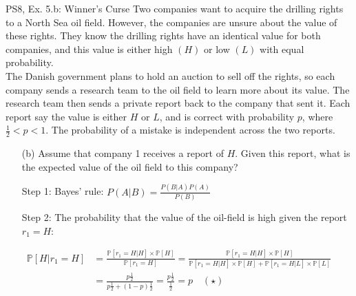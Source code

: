 \begin{frame}{PS8, Ex. 5.b: Winner's Curse}
      Two companies want to acquire the drilling rights to a North Sea oil field. However, the companies are unsure about the value of these rights. They know the drilling rights have an identical value for both companies, and this value is either high $(H)$ or low $(L)$ with equal probability.\\\smallskip
      The Danish government plans to hold an auction to sell off the rights, so each company sends a research team to the oil field to learn more about its value. The research team then sends a private report back to the company that sent it. Each report say the value is either $H$ or $L$, and is correct with probability $p$, where $\frac{1}{2} < p < 1$. The probability of a mistake is independent across the two reports.
      \begin{itemize}
        \item[(b)] Assume that company 1 receives a report of $H$. Given this report, what is the expected value of the oil field to this company?
        \item[Step 1:] Bayes' rule: $P(A|B)=\frac{P(B|A)P(A)}{P(B)}$
        \item[Step 2:] The probability that the value of the oil-field is high given the report $r_1=H$:
      \end{itemize}
      \vspace{-12pt}
      \begin{align*}
        \mathbb{P}[H|r_1=H]
        &=\frac{\mathbb{P}[r_1=H|H]\times\mathbb{P}[H]}{\mathbb{P}[r_1=H]}
        =\frac{\mathbb{P}[r_1=H|H]\times\mathbb{P}[H]}{\mathbb{P}[r_1=H|H]\times\mathbb{P}[H]+\mathbb{P}[r_1=H|L]\times\mathbb{P}[L]}\\
        &=\frac{p\frac{1}{2}}{p\frac{1}{2}+(1-p)\frac{1}{2}}=\frac{p\frac{1}{2}}{\frac{1}{2}}=p\quad (\star)
      \end{align*}
      \vfill\null
\end{frame}
